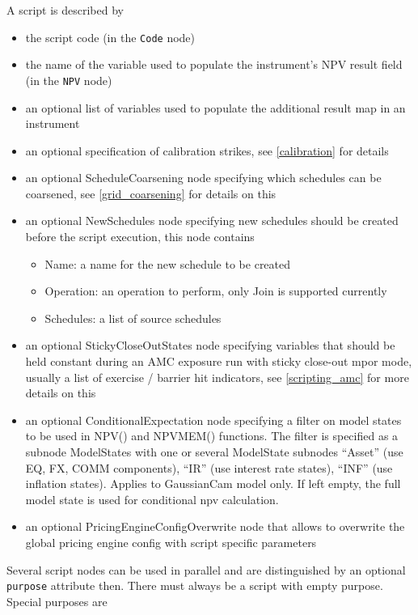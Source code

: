 A script is described by

\begin{itemize}
\item the script code (in the \verb+Code+ node)
\item the name of the variable used to populate the instrument's NPV result field (in the \verb+NPV+ node)
\item an optional list of variables used to populate the additional result map in an instrument
\item an optional specification of calibration strikes, see \ref{calibration} for details
\item an optional ScheduleCoarsening node specifying which schedules can be coarsened, see \ref{grid_coarsening} for details
  on this
\item an optional NewSchedules node specifying new schedules should be created before the script execution, this node
  contains
  \begin{itemize}
  \item Name: a name for the new schedule to be created
  \item Operation: an operation to perform, only Join is supported currently
  \item Schedules: a list of source schedules
  \end{itemize}
\item an optional StickyCloseOutStates node specifying variables that should be held constant during an AMC exposure run
  with sticky close-out mpor mode, usually a list of exercise / barrier hit indicators, see \ref{scripting_amc} for more
  details on this
\item an optional ConditionalExpectation node specifying a filter on model states to be used in NPV() and NPVMEM()
  functions. The filter is specified as a subnode ModelStates with one or several ModelState subnodes ``Asset'' (use EQ,
  FX, COMM components), ``IR'' (use interest rate states), ``INF'' (use inflation states). Applies to GaussianCam model
  only. If left empty, the full model state is used for conditional npv calculation.
\item an optional PricingEngineConfigOverwrite node that allows to overwrite the global pricing engine config with
  script specific parameters
\end{itemize}

Several script nodes can be used in parallel and are distinguished by an optional \verb+purpose+ attribute then. There
must always be a script with empty purpose. Special purposes are

